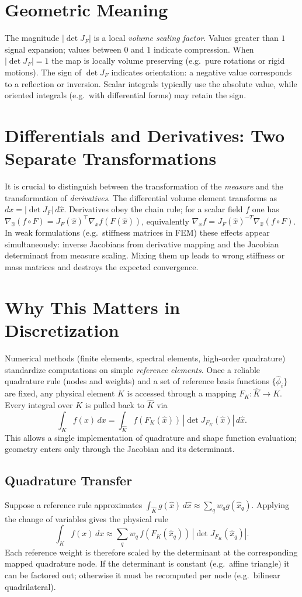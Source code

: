 \documentclass[11pt]{article}
\begin{document}
\section{Geometric Meaning}
The magnitude $|\det J_F|$ is a local \emph{volume scaling factor}. Values greater than $1$ signal expansion; values between $0$ and $1$ indicate compression. When $|\det J_F|=1$ the map is locally volume preserving (e.g.\ pure rotations or rigid motions). The sign of $\det J_F$ indicates orientation: a negative value corresponds to a reflection or inversion. Scalar integrals typically use the absolute value, while oriented integrals (e.g.\ with differential forms) may retain the sign.

\section{Differentials and Derivatives: Two Separate Transformations}
It is crucial to distinguish between the transformation of the \emph{measure}
and the transformation of \emph{derivatives}. The differential volume element
transforms as $dx = |\det J_F|\, d\hat x$. Derivatives obey the chain rule; for
a scalar field $f$ one has $\nabla_{\hat x}(f\circ F)=J_F{(\hat x)}^{\top}\nabla_x
f(F(\hat x))$, equivalently $\nabla_x f = J_F{(\hat x)}^{-T}\nabla_{\hat x}(f\circ
F)$. In weak formulations (e.g.\ stiffness matrices in FEM) these effects appear
simultaneously: inverse Jacobians from derivative mapping and the Jacobian
determinant from measure scaling. Mixing them up leads to wrong stiffness or
mass matrices and destroys the expected convergence.

\section{Why This Matters in Discretization}
Numerical methods (finite elements, spectral elements, high-order quadrature) standardize computations on simple \emph{reference elements}. Once a reliable quadrature rule (nodes and weights) and a set of reference basis functions $\{\hat\phi_i\}$ are fixed, any physical element $K$ is accessed through a mapping $F_K:\hat K\to K$. Every integral over $K$ is pulled back to $\hat K$ via
\[
\int_K f(x)\,dx = \int_{\hat K} f(F_K(\hat x))\,|\det J_{F_K}(\hat x)|\, d\hat x.
\]
This allows a single implementation of quadrature and shape function evaluation; geometry enters only through the Jacobian and its determinant.

\subsection{Quadrature Transfer}
Suppose a reference rule approximates $\int_{\hat K} g(\hat x)\, d\hat x \approx \sum_q w_q g(\hat x_q)$. Applying the change of variables gives the physical rule
\[
\int_{K} f(x)\,dx \approx \sum_q w_q\, f(F_K(\hat x_q))\, |\det J_{F_K}(\hat x_q)|.
\]
Each reference weight is therefore scaled by the determinant at the corresponding mapped quadrature node. If the determinant is constant (e.g.\ affine triangle) it can be factored out; otherwise it must be recomputed per node (e.g.\ bilinear quadrilateral).
\end{document}
